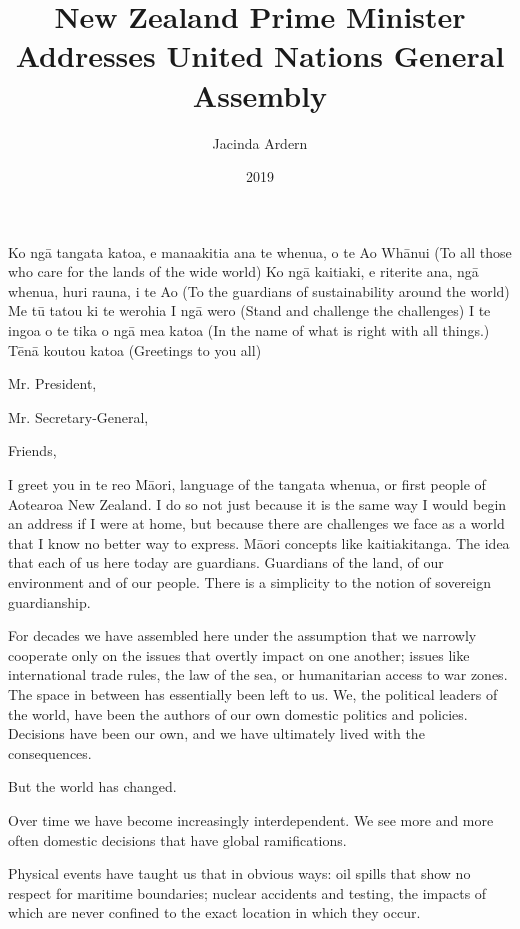 \documentclass[10pt,a4paper]{article}
\begin{document}
\title{New Zealand Prime Minister Addresses United Nations General Assembly}
\date{2019}
\author{Jacinda Ardern}
\maketitle
    
\pagestyle{empty}
\thispagestyle{empty}
\linenumbers
Ko ngā tangata katoa, e manaakitia ana te whenua, o te Ao Whānui
(To all those who care for the lands of the wide world)
Ko ngā kaitiaki, e riterite ana, ngā whenua, huri rauna, i te Ao
(To the guardians of sustainability around the world)
Me tū tatou ki te werohia I ngā wero
(Stand and challenge the challenges)
I te ingoa o te tika o ngā mea katoa
(In the name of what is right with all things.)
Tēnā koutou katoa
(Greetings to you all)

Mr. President,

Mr. Secretary-General,

Friends,

I greet you in te reo Māori, language of the tangata whenua, or first people of Aotearoa New Zealand. I do so not just because it is the same way I would begin an address if I were at home, but because there are challenges we face as a world that I know no better way to express. Māori concepts like kaitiakitanga. The idea that each of us here today are guardians. Guardians of the land, of our environment and of our people. There is a simplicity to the notion of sovereign guardianship.

For decades we have assembled here under the assumption that we narrowly cooperate only on the issues that overtly impact on one another; issues like international trade rules, the law of the sea, or humanitarian access to war zones. The space in between has essentially been left to us. We, the political leaders of the world, have been the authors of our own domestic politics and policies. Decisions have been our own, and we have ultimately lived with the consequences.

But the world has changed.

Over time we have become increasingly interdependent. We see more and more often domestic decisions that have global ramifications.

Physical events have taught us that in obvious ways: oil spills that show no respect for maritime boundaries; nuclear accidents and testing, the impacts of which are never confined to the exact location in which they occur.
\end{document}
